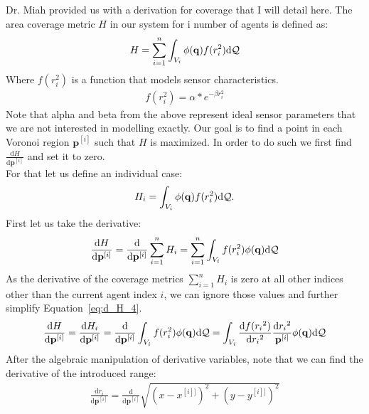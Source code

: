 Dr. Miah provided us with a derivation for coverage that I will detail here. The area coverage metric $H$ in our system for i number of agents is defined as:
\begin{align}
 H = \displaystyle\sum_{i=1}^{n} \int_{V_i} \phi(\mathbf{q}) f(r_{i}^2) \mathrm{d}{\cal Q}   
\end{align}
Where $f(r_{i}^2)$ is a function that models sensor characteristics.
\begin{align}
    f(r_{i}^2) = \alpha*e^{-\beta r_{i}^2}
\end{align}
Note that alpha and beta from the above represent ideal sensor parameters that we are not interested in modelling exactly. Our goal is to find a point in each Voronoi region ${\mathbf{p}}^{[i]}$ such that $H$ is maximized. In order to do such we first find $\frac{\mathrm{d}H}{\mathrm{d}\mathbf{p}^{[i]}}$ and set it to zero. 
\\
For that let us define an individual case:
\begin{align}
    H_{i} = \int_{V_i} \phi(\mathbf{q}) f(r_{i}^2) \mathrm{d}{\cal Q}.
\end{align}
First let us take the derivative:
\begin{align}
    \frac{\mathrm{d}H}{\mathrm{d}\mathbf{p}^{[i]}} = \frac{\mathrm{d}}{\mathrm{d}\mathbf{p}^{[i]}} \displaystyle\sum_{i=1}^{n} H_i = \displaystyle\sum_{i=1}^{n} \int_{V_i} f(r_{i}^2) \phi(\mathbf{q}) \mathrm{d}{\cal Q}
    \label{eq:d_H_4}
\end{align}
As the derivative of the coverage metrics $\displaystyle\sum_{i=1}^{n}H_i$ is zero at all other indices other than the current agent index $i$, we can ignore those values and further simplify Equation~\eqref{eq:d_H_4}.
\begin{align}
    \frac{\mathrm{d}H}{\mathrm{d}\mathbf{p}^{[i]}} = \frac{\mathrm{d}H_i}{\mathrm{d}\mathbf{p}^{[i]}} = \frac{\mathrm{d}}{\mathrm{d}\mathbf{p}^{[i]}} \int_{V_i} f(r_{i}^2) \phi(\mathbf{q}) \mathrm{d}{\cal Q} = \int_{V_i} \frac{\mathrm{d}f({r_i}^2)}{\mathrm{d}{r_i}^2} \frac{\mathrm{d}{r_i}^2}{\mathbf{p}^{[i]}} \phi(\mathbf{q})\mathrm{d}{\cal Q}
    \label{eq:d_H_5}
\end{align}
After the algebraic manipulation of derivative variables, note that we can find the derivative of the introduced range:
\begin{align}
    \frac{\mathrm{d}{r_i}}{\mathrm{d}\mathbf{p}^{[i]}} = \frac{\mathrm{d}}{\mathrm{d}\mathbf{p}^{[i]}}\sqrt{(x-{x}^{[i]]})^2 + (y-{y}^{[i]]})^2}
    \label{eq:d_ri_6}
\end{align}
